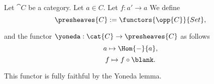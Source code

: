 \begin{definition}
Let $\cat{C}$ be a category.
Let $a\in C$.
Let $f: a' \rightarrow a$
We define
\[\presheaves{C} := \functors{\opp{C}}{Set},\]

and the functor $\yoneda: \cat{C} \rightarrow  \presheaves{C}$ as follows 
\[a \mapsto \Hom{-}{a},\]
\[f \mapsto f \circ \blank.\]

This functor is fully faithful by the Yoneda lemma.
\end{definition}